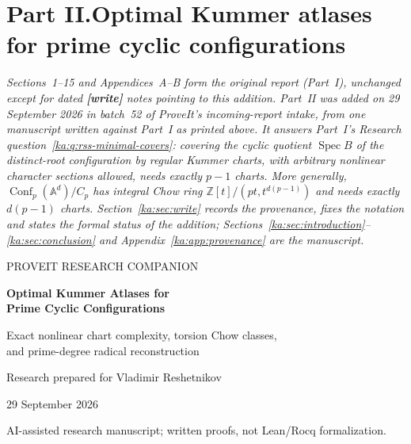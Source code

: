 \documentclass[11pt,a4paper]{article}
\theoremstyle{definition}
\theoremstyle{remark}
\newcommand{\Z}{\mathbb Z}
\newcommand{\Spec}{\operatorname{Spec}}
\newcommand{\A}{\mathbb A}
\newcommand{\Conf}{\operatorname{Conf}}
\begin{document}
\clearpage
\setcounter{section}{15}
\renewcommand{\thesection}{\arabic{section}}
\makeatletter\gdef{}\gdef{}\makeatother
{}\part*{Part II.\quad Optimal Kummer atlases for prime cyclic configurations}

\noindent\emph{Sections~1--15 and Appendices~A--B form
the original report (Part~I), unchanged except for dated \textbf{[write]}
notes pointing to this addition. Part~II was added on 29 September 2026 in
batch~52 of ProveIt's incoming-report intake, from one manuscript written
against Part~I as printed above. It answers Part~I's Research
question~\ref{ka:q:rss-minimal-covers}: covering the cyclic quotient
$\Spec B$ of the distinct-root configuration by regular Kummer charts, with
arbitrary nonlinear character sections allowed, needs exactly $p-1$ charts.
More generally, $\Conf_p(\A^d)/C_p$ has integral Chow ring
$\Z[t]/(pt,t^{d(p-1)})$ and needs exactly $d(p-1)$ charts.
Section~\ref{ka:sec:write} records the provenance, fixes the notation and
states the formal status of the addition; Sections~\ref{ka:sec:introduction}--%
\ref{ka:sec:conclusion} and Appendix~\ref{ka:app:provenance} are the
manuscript.}

\begin{center}
{\small\sffamily\color{accent} PROVEIT RESEARCH COMPANION\par}
\vspace{0.3cm}
{\LARGE\bfseries\color{ink} Optimal Kummer Atlases for\\[2mm]
 Prime Cyclic Configurations\par}
\vspace{0.25cm}
{\large Exact nonlinear chart complexity, torsion Chow classes,\\
 and prime-degree radical reconstruction\par}
\vspace{0.3cm}
{Research prepared for Vladimir Reshetnikov\par}
{29 September 2026\par}
\vspace{0.2cm}
{\small AI-assisted research manuscript; written proofs, not Lean/Rocq formalization.\par}
\end{center}
\end{document}
